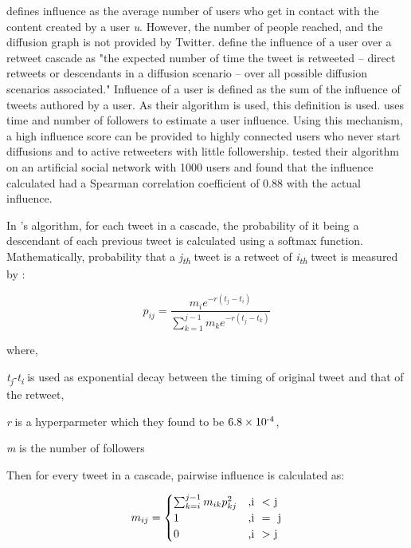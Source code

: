 \documentclass[letterpaper]{article}
\begin{document}
\cite{du2013scalable} defines influence as the average number of users who get in contact with the content created by a user \textit{u}.
 However, the number of people reached, and the diffusion graph is not provided by Twitter. \cite{rizoiu2018debatenight} define the influence of a user over a retweet cascade as "the expected number of time the tweet is
 retweeted – direct retweets or descendants in a diffusion scenario – over all possible diffusion scenarios  associated." Influence of a user is defined as the sum of the influence of tweets
 authored by a user. As their algorithm is used, this definition is used. \cite{rizoiu2018debatenight} uses time and 
 number of followers to estimate a user influence. Using this mechanism, a high influence score can be provided to highly connected users who never start diffusions and 
 to active retweeters with little followership. \cite{rizoiu2018debatenight} tested their algorithm on an artificial social network with 1000 users and found that the influence calculated had a Spearman 
 correlation coefficient of 0.88 with the actual influence. \par 

In \cite{rizoiu2018debatenight}'s algorithm, for each tweet in a cascade, the probability of it being a descendant of each previous tweet is calculated using a softmax function. Mathematically, probability that a \textit{j\textsubscript{th}} 
tweet is a retweet of \textit{i\textsubscript{th}} tweet is measured by :\linebreak

\begin{equation*}
    p_{ij}=\frac{{m_{i}e^{-r(t_j-t_i)}}}{\sum_{k=1}^{j-1}m_ke^{-r(t_j-t_k)}}
    \label{eq:probablity}
\end{equation*}

where, \par
\textit{t\textsubscript{j}{-}t\textsubscript{i}} is used as exponential decay between the timing of original tweet and that of the retweet, \par
\textit{r} is a hyperparmeter which they found to be $6.8\times10\textsuperscript{-4}$, \par
\textit{m} is the number of followers \linebreak

Then for every tweet in a cascade, pairwise influence is calculated as:

\begin{equation}
    m_{ij} =
      \begin{cases}
        \sum_{k=i}^{j-1}m_{ik}p_{kj}^2 & \text{,i \ \textless \ j}\\
        1 & \text{,i \ = \ j}\\
        0 & \text{,i \ \textgreater \ j}
      \end{cases}       
    \end{equation}
\end{document}
